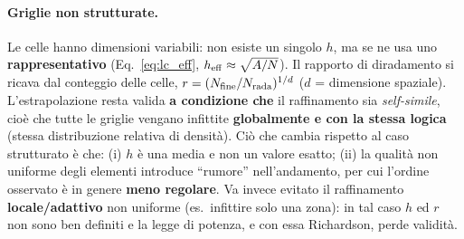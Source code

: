 \paragraph{Griglie non strutturate.} Le celle hanno dimensioni variabili: non esiste un singolo
$h$, ma se ne usa uno \textbf{rappresentativo} (Eq.~\ref{eq:lc_eff}, $h_{\rm eff}\approx\sqrt{A/N}$).
Il rapporto di diradamento si ricava dal conteggio delle celle, $r = (N_{\rm fine}/N_{\rm rada})^{1/d}$
($d$ = dimensione spaziale). L'estrapolazione resta valida \textbf{a condizione che} il raffinamento
sia \emph{self-simile}, cioè che tutte le griglie vengano infittite \textbf{globalmente e con la
stessa logica} (stessa distribuzione relativa di densità). Ciò che cambia rispetto al caso
strutturato è che: (i) $h$ è una media e non un valore esatto; (ii) la qualità non uniforme degli
elementi introduce ``rumore'' nell'andamento, per cui l'ordine osservato è in genere \textbf{meno
regolare}. Va invece evitato il raffinamento \textbf{locale/adattivo} non uniforme (es.\ infittire
solo una zona): in tal caso $h$ ed $r$ non sono ben definiti e la legge di potenza, e con essa
Richardson, perde validità.
